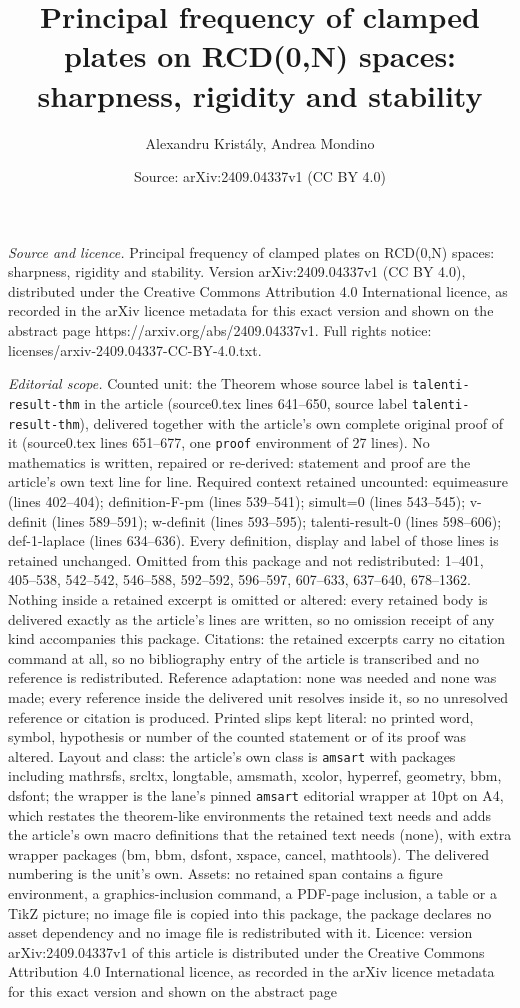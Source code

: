 \documentclass[10pt,a4paper]{amsart}
\title[Principal frequency of clamped plates on RCD(0,N) spaces: sh]{Principal frequency of clamped plates on RCD(0,N) spaces: sharpness, rigidity and stability}
\author{Alexandru Krist\'aly, Andrea Mondino}
\date{Source: arXiv:2409.04337v1 (CC BY 4.0)}
\begin{document}
\maketitle

\noindent\emph{Source and licence.} Principal frequency of clamped plates on RCD(0,N) spaces: sharpness, rigidity and stability. Version arXiv:2409.04337v1 (CC BY 4.0), distributed under the Creative Commons Attribution 4.0 International licence, as recorded in the arXiv licence metadata for this exact version and shown on the abstract page https://arxiv.org/abs/2409.04337v1. Full rights notice: licenses/arxiv-2409.04337-CC-BY-4.0.txt.\par\smallskip

\noindent\textit{Editorial scope.} Counted unit: the Theorem whose source label is \texttt{talenti-result-thm} in the article (source0.tex lines 641--650, source label \texttt{talenti-result-thm}), delivered together with the article's own complete original proof of it (source0.tex lines 651--677, one \texttt{proof} environment of 27 lines). No mathematics is written, repaired or re-derived: statement and proof are the article's own text line for line. Required context retained uncounted: equimeasure (lines 402--404); definition-F-pm (lines 539--541); simult=0 (lines 543--545); v-definit (lines 589--591); w-definit (lines 593--595); talenti-result-0 (lines 598--606); def-1-laplace (lines 634--636). Every definition, display and label of those lines is retained unchanged. Omitted from this package and not redistributed: 1--401, 405--538, 542--542, 546--588, 592--592, 596--597, 607--633, 637--640, 678--1362. Nothing inside a retained excerpt is omitted or altered: every retained body is delivered exactly as the article's lines are written, so no omission receipt of any kind accompanies this package. Citations: the retained excerpts carry no citation command at all, so no bibliography entry of the article is transcribed and no reference is redistributed. Reference adaptation: none was needed and none was made; every reference inside the delivered unit resolves inside it, so no unresolved reference or citation is produced. Printed slips kept literal: no printed word, symbol, hypothesis or number of the counted statement or of its proof was altered. Layout and class: the article's own class is \texttt{amsart} with packages including mathrsfs, srcltx, longtable, amsmath, xcolor, hyperref, geometry, bbm, dsfont; the wrapper is the lane's pinned \texttt{amsart} editorial wrapper at 10pt on A4, which restates the theorem-like environments the retained text needs and adds the article's own macro definitions that the retained text needs (none), with extra wrapper packages (bm, bbm, dsfont, xspace, cancel, mathtools). The delivered numbering is the unit's own. Assets: no retained span contains a figure environment, a graphics-inclusion command, a PDF-page inclusion, a table or a TikZ picture; no image file is copied into this package, the package declares no asset dependency and no image file is redistributed with it. Licence: version arXiv:2409.04337v1 of this article is distributed under the Creative Commons Attribution 4.0 International licence, as recorded in the arXiv licence metadata for this exact version and shown on the abstract page 
\end{document}
